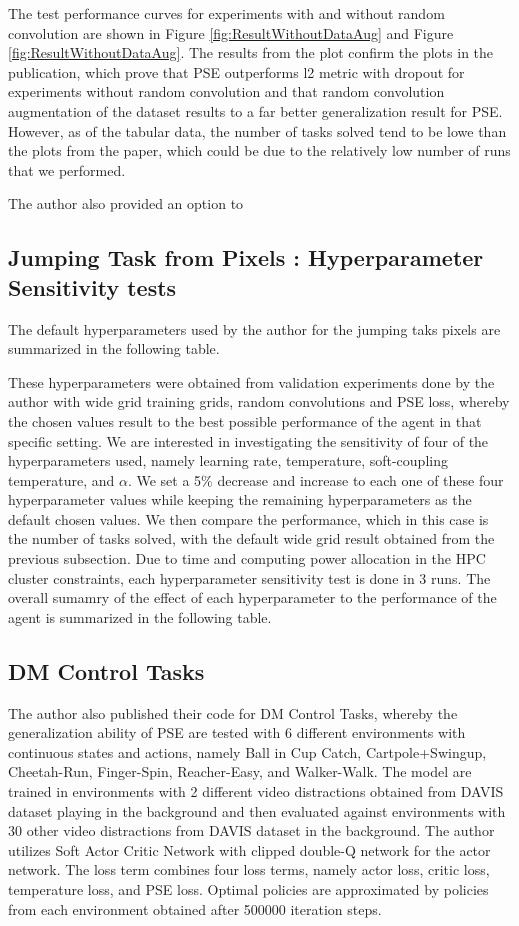 \documentclass{usiinftr}
\begin{document}
The test performance curves for experiments with and without random convolution are shown in Figure \ref{fig:ResultWithoutDataAug} and Figure \ref{fig:ResultWithoutDataAug}. The results from the plot confirm the plots in the publication, which prove that PSE outperforms l2 metric with dropout for experiments without random convolution and that random convolution augmentation of the dataset results to a far better generalization result for PSE. However, as of the tabular data, the number of tasks solved tend to be lowe than the plots from the paper, which could be due to the relatively low number of runs that we performed. 

The author also provided an option to 

\subsection{Jumping Task from Pixels : Hyperparameter Sensitivity tests}
The default hyperparameters used by the author for the jumping taks pixels are summarized in the following table. 

These hyperparameters were obtained from validation experiments done by the author with wide grid training grids, random convolutions and PSE loss, whereby the chosen values result to the best possible performance of the agent in that specific setting. We are interested in investigating the sensitivity of four of the hyperparameters used, namely learning rate, temperature, soft-coupling temperature, and $\alpha$. We set a 5\% decrease and increase to each one of these four hyperparameter values while keeping the remaining hyperparameters as the default chosen values. We then compare the performance, which in this case is the number of tasks solved, with the default wide grid result obtained from the previous subsection. Due to time and computing power allocation in the HPC cluster constraints, each hyperparameter sensitivity test is done in 3 runs. The overall sumamry of the effect of each hyperparameter to the performance of the agent is summarized in the following table.


\subsection{DM Control Tasks}
The author also published their code for DM Control Tasks, whereby the generalization ability of PSE are tested with 6 different environments with continuous states and actions, namely Ball in Cup Catch, Cartpole+Swingup, Cheetah-Run, Finger-Spin, Reacher-Easy, and Walker-Walk. The model are trained in environments with 2 different video distractions obtained from DAVIS dataset playing in the background and then evaluated against environments with 30 other video distractions from DAVIS dataset in the background. The author utilizes Soft Actor Critic Network with clipped double-Q network for the actor network. The loss term combines four loss terms, namely actor loss, critic loss, temperature loss, and PSE loss. Optimal policies are approximated by policies from each environment obtained after 500000 iteration steps. 
\end{document}
